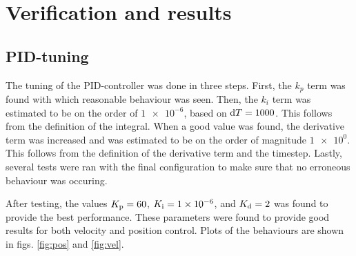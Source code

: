 \documentclass[11pt]{article}
\begin{document}



\section{Verification and results}
\subsection{PID-tuning}
The tuning of the PID-controller was done in three steps. First, the $k_p$ term was found with which reasonable behaviour was seen. Then, the $k_i$ term was estimated to be on the order of $\num{1e-6}$, based on $\dif T=1000$. This follows from the definition of the integral. When a good value was found, the derivative term was increased and was estimated to be on the order of magnitude $\num{1e0}$. This follows from the definition of the derivative term and the timestep. Lastly, several tests were ran with the final configuration to make sure that no erroneous behaviour was occuring. \par

After testing, the values $K_\textup{p} = 60$, $K_\textup{i} = \num{1e-6}$, and $K_\textup{d}= 2$ was found to provide the best performance. These parameters were found to provide good results for both velocity and position control. Plots of the behaviours are shown in figs. \ref{fig:pos} and \vref{fig:vel}. \par
\end{document}
